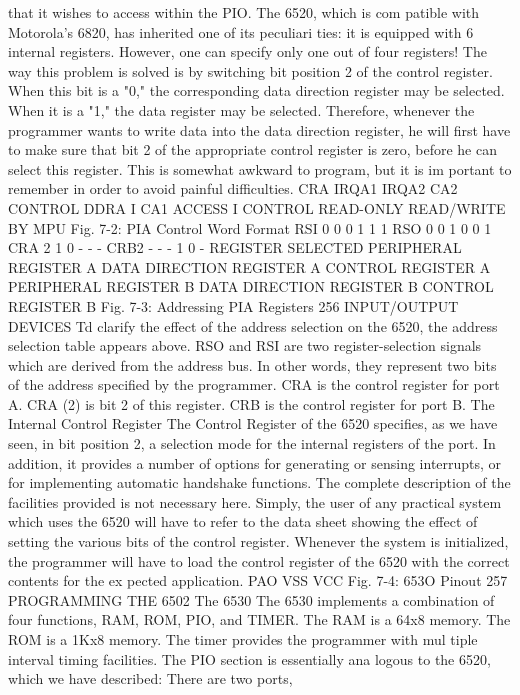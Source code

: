 that it wishes to access within the PIO. The 6520, which is com
patible with Motorola's 6820, has inherited one of its peculiari
ties: it is equipped with 6 internal registers. However, one can
specify only one out of four registers! The way this problem is
solved is by switching bit position 2 of the control register. When
this bit is a "0," the corresponding data direction register may be
selected. When it is a "1," the data register may be selected.
Therefore, whenever the programmer wants to write data into the
data direction register, he will first have to make sure that bit 2
of the appropriate control register is zero, before he can select
this register. This is somewhat awkward to program, but it is im
portant to remember in order to avoid painful difficulties.
CRA IRQA1 IRQA2 CA2 CONTROL
DDRA I CA1
ACCESS I CONTROL
READ-ONLY READ/WRITE BY MPU
Fig. 7-2: PIA Control Word Format
RSI
0
0
0
1
1
1
RSO
0
0
1
0
0
1
CRA 2
1
0
-
-
-
CRB2
-
-
-
1
0
-
REGISTER SELECTED
PERIPHERAL REGISTER A
DATA DIRECTION REGISTER A
CONTROL REGISTER A
PERIPHERAL REGISTER B
DATA DIRECTION REGISTER B
CONTROL REGISTER B
Fig. 7-3: Addressing PIA Registers
256
INPUT/OUTPUT DEVICES
Td clarify the effect of the address selection on the 6520, the
address selection table appears above. RSO and RSI are two
register-selection signals which are derived from the address bus.
In other words, they represent two bits of the address specified by
the programmer. CRA is the control register for port A. CRA (2)
is bit 2 of this register. CRB is the control register for port B.
The Internal Control Register
The Control Register of the 6520 specifies, as we have seen, in
bit position 2, a selection mode for the internal registers of the
port. In addition, it provides a number of options for generating or
sensing interrupts, or for implementing automatic handshake
functions. The complete description of the facilities provided is
not necessary here. Simply, the user of any practical system which
uses the 6520 will have to refer to the data sheet showing the
effect of setting the various bits of the control register. Whenever
the system is initialized, the programmer will have to load the
control register of the 6520 with the correct contents for the ex
pected application.
PAO
VSS VCC
Fig. 7-4: 653O Pinout
257
PROGRAMMING THE 6502
The 6530
The 6530 implements a combination of four functions, RAM,
ROM, PIO, and TIMER. The RAM is a 64x8 memory. The ROM
is a 1Kx8 memory. The timer provides the programmer with mul
tiple interval timing facilities. The PIO section is essentially ana
logous to the 6520, which we have described: There are two ports,
